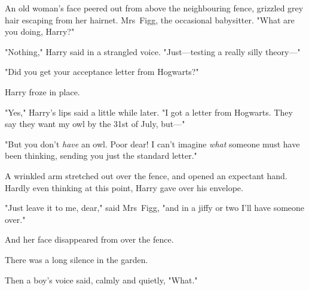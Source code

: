An old woman's face peered out from above the neighbouring fence, grizzled grey
hair escaping from her hairnet. Mrs~Figg, the occasional babysitter. "What are
you doing, Harry?"

"Nothing," Harry said in a strangled voice. "Just—testing a really silly
theory—"

"Did you get your acceptance letter from Hogwarts?"

Harry froze in place.

"Yes," Harry's lips said a little while later. "I got a letter from Hogwarts.
They say they want my owl by the 31st of July, but—"

"But you don't \emph{have} an owl. Poor dear! I can't imagine \emph{what}
someone must have been thinking, sending you just the standard letter."

A wrinkled arm stretched out over the fence, and opened an expectant hand.
Hardly even thinking at this point, Harry gave over his envelope.

"Just leave it to me, dear," said Mrs~Figg, "and in a jiffy or two I'll have
someone over."

And her face disappeared from over the fence.

There was a long silence in the garden.

Then a boy's voice said, calmly and quietly, "What."
